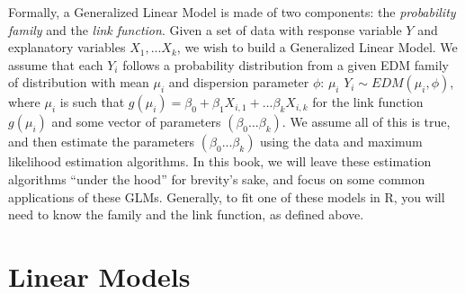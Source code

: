 \documentclass[
]{book}
\begin{document}
Formally, a Generalized Linear Model is made of two components: the \emph{probability family} and the \emph{link function}. Given a set of data with response variable \(Y\) and explanatory variables \(X_1, ... X_k\), we wish to build a Generalized Linear Model. We assume that each \(Y_i\) follows a probability distribution from a given EDM family of distribution with mean \(\mu_i\) and dispersion parameter \(\phi\): \(\mu_i\) \(Y_i \sim EDM(\mu_i,\phi)\), where \(\mu_i\) is such that \(g(\mu_i) = \beta_0 + \beta_1X_{i,1} + ... \beta_kX_{i,k}\) for the link function \(g(\mu_i)\) and some vector of parameters \((\beta_0...\beta_k)\). We assume all of this is true, and then estimate the parameters \((\beta_0...\beta_k)\) using the data and maximum likelihood estimation algorithms. In this book, we will leave these estimation algorithms ``under the hood'' for brevity's sake, and focus on some common applications of these GLMs. Generally, to fit one of these models in R, you will need to know the family and the link function, as defined above.

\hypertarget{linear}{%
\chapter{Linear Models}\label{linear}}
\end{document}
